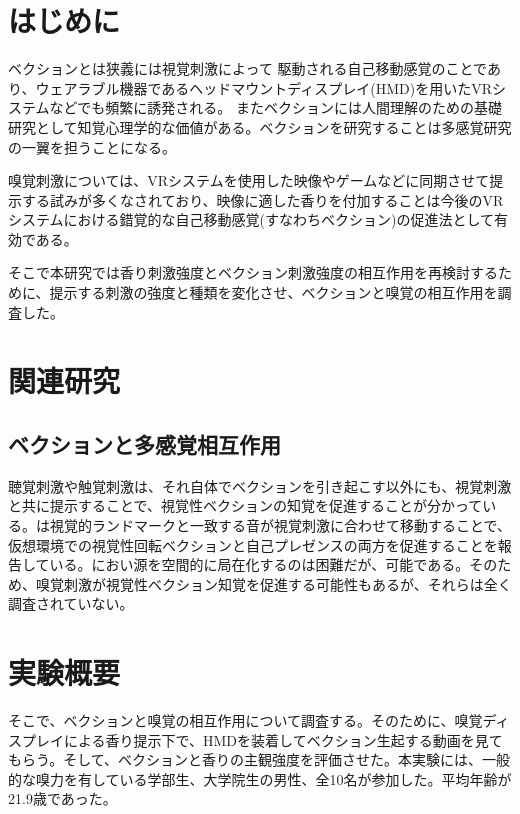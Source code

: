 \documentclass[uplatex]{jsarticle}   %
\begin{document}

\vspace{3mm}

\setcounter{page}{5}



\section{はじめに}
ベクションとは狭義には視覚刺激によって
駆動される自己移動感覚のことであり、ウェアラブル機器であるヘッドマウントディスプレイ(HMD)を用いたVRシステムなどでも頻繁に誘発される\cite{翔悟17}。
またベクションには人間理解のための基礎研究として知覚心理学的な価値がある。ベクションを研究することは多感覚研究の一翼を担うことになる。

嗅覚刺激については、VRシステムを使用した映像やゲームなどに同期させて提示する試みが多くなされており、映像に適した香りを付加することは今後のVRシステムにおける錯覚的な自己移動感覚(すなわちベクション)の促進法として有効である。

そこで本研究では香り刺激強度とベクション刺激強度の相互作用を再検討するために、提示する刺激の強度と種類を変化させ、ベクションと嗅覚の相互作用を調査した。

\section{関連研究}
\subsection{ベクションと多感覚相互作用}
聴覚刺激や触覚刺激は、それ自体でベクションを引き起こす以外にも、視覚刺激と共に提示することで、視覚性ベクションの知覚を促進することが分かっている。\cite{翔悟20}は視覚的ランドマークと一致する音が視覚刺激に合わせて移動することで、仮想環境での視覚性回転ベクションと自己プレゼンスの両方を促進することを報告している。におい源を空間的に局在化するのは困難だが、可能である\cite{翔悟21}。そのため、嗅覚刺激が視覚性ベクション知覚を促進する可能性もあるが、それらは全く調査されていない。

\section{実験概要}
そこで、ベクションと嗅覚の相互作用について調査する。そのために、嗅覚ディスプレイによる香り提示下で、HMDを装着してベクション生起する動画を見てもらう。そして、ベクションと香りの主観強度を評価させた。本実験には、一般的な嗅力を有している学部生、大学院生の男性、全10名が参加した。平均年齢が21.9歳であった。
\end{document}
